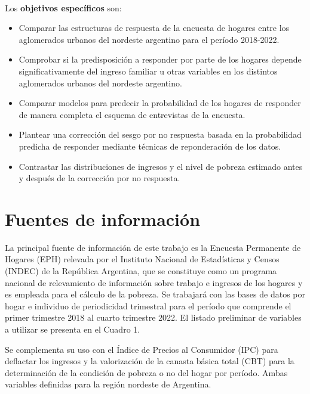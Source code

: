 \documentclass{article}
\begin{document}
\

Los \textbf{objetivos específicos} son:

\begin{itemize}
    \item Comparar las estructuras de respuesta de la encuesta de hogares entre los aglomerados urbanos del nordeste argentino para el período 2018-2022.
    \item Comprobar si la predisposición a responder por parte de los hogares depende significativamente del ingreso familiar u otras variables en los distintos aglomerados urbanos del nordeste argentino.
    \item Comparar modelos para predecir la probabilidad de los hogares de responder de manera completa el esquema de entrevistas de la encuesta.
    \item Plantear una corrección del sesgo por no respuesta basada en la probabilidad predicha de responder mediante técnicas de reponderación de los datos.
    \item Contrastar las distribuciones de ingresos y el nivel de pobreza estimado antes y después de la corrección por no respuesta.
\end{itemize}

\section{Fuentes de información}

La principal fuente de información de este trabajo es la Encuesta Permanente de Hogares (EPH) relevada por el Instituto Nacional de Estadísticas y Censos (INDEC) de la República Argentina, que se constituye como un programa nacional de relevamiento de información sobre trabajo e ingresos de los hogares y es empleada para el cálculo de la pobreza. Se trabajará con las bases de datos por hogar e individuo de periodicidad trimestral para el período que comprende el primer trimestre 2018 al cuarto trimestre 2022. El listado preliminar de variables a utilizar se presenta en el Cuadro 1.

Se complementa su uso con el Índice de Precios al Consumidor (IPC) para deflactar los ingresos y la valorización de la canasta básica total (CBT) para la determinación de la condición de pobreza o no del hogar por período. Ambas variables definidas para la región nordeste de Argentina.
\end{document}
